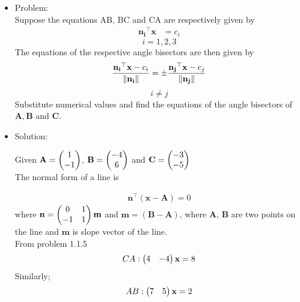 \documentclass{article}
\begin{document}
\let\vec\mathbf
\begin{itemize}

\item Problem:
   \\ Suppose the equations AB, BC and CA are respectively given by 
                 \begin{align}
                 \label{eq:a}
                 \vec{n_i}^{\top}\vec{x} &= c_i
                 \end{align}      
                \[i=1,2,3\]
The equations of the respective angle bisectors are then given by
\begin{align}
\label{eq:b}
\frac{\vec{n_i}^{\top}\vec{x}-c_i}{\norm{\vec{n_i}}} = \pm\frac{\vec{n_j}^{\top}\vec{x}-c_j}{\norm{{\vec{n_j}}}}
\end{align}
\[i \neq j\]
Substitute numerical values and find the equations of the angle bisectors of $\vec{A},\vec{B}$ and $\vec{C}$.



\item Solution:
    
Given $\vec{A} = \myvec{1\\-1}$, $\vec{B} = \myvec{-4\\6}$ and $\vec{C} = \myvec{-3\\-5}$
 \\The normal form of a line is 
                                    
           \begin{align}
           \label{eq:c}
           \vec{n}^{\top}(\vec{x}-\vec{A}) = 0   
           \end{align}
           where $\vec{n} = \myvec{0&1\\-1&1}\vec{m}$ and $\vec{m} = (\vec{B} - \vec{A})$, where $\vec{A}$, $\vec{B}$ are two points on the line and $\vec{m}$ is slope vector of the line.\\
 From problem 1.1.5 %
  \begin{align}
  \label{eq:d}
        CA : \myvec{4&-4}\vec{x} = 8
        \end{align}
  Similarly;
        \begin{align}
         \label{eq:e}
        AB : \myvec{7&5}\vec{x} = 2
        \end{align}
        

\end{itemize}
\end{document}
